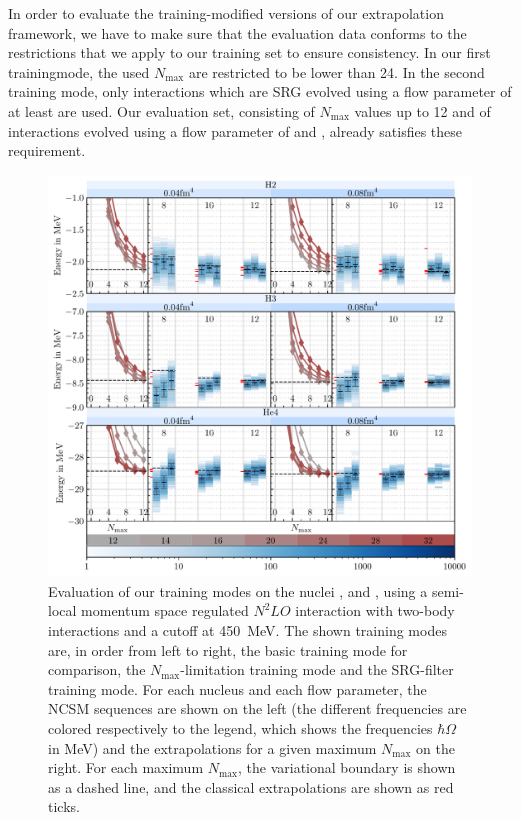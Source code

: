 In order to evaluate the training-modified versions of our extrapolation framework, we have to make sure that the evaluation data conforms to the restrictions that we apply to our training set to ensure consistency. In our first trainingmode, the used $N_\mathrm{max}$ are restricted to be lower than 24. In the second training mode, only interactions which are SRG evolved using a flow parameter of at least  are used. Our evaluation set, consisting of $N_\mathrm{max}$ values up to 12 and of interactions evolved using a flow parameter of  and , already satisfies these requirement.
\begin{figure}[H]
  \includegraphics[width=\textwidth]{media/extended_evaluation.pdf}
  \caption{Evaluation of our training modes on the nuclei ,  and , using a semi-local momentum space regulated $N^2LO$ interaction with two-body interactions and a cutoff at \SI{450}{\mega\electronvolt}. The shown training modes are, in order from left to right, the basic training mode for comparison, the $N_\mathrm{max}$-limitation training mode and the SRG-filter training mode. For each nucleus and each flow parameter, the NCSM sequences are shown on the left (the different frequencies are colored respectively to the legend, which shows the frequencies $\hbar\Omega$ in \si[]{\mega\electronvolt}) and the extrapolations for a given maximum $N_\mathrm{max}$ on the right. For each maximum $N_\mathrm{max}$, the variational boundary is shown as a dashed line, and the classical extrapolations are shown as red ticks.}
  \label{fig:eval_extended}
\end{figure}

